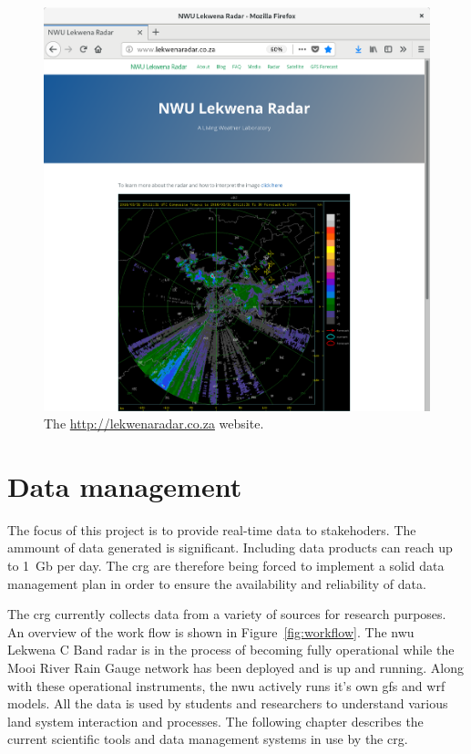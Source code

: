 \documentclass{wrcreport}
\begin{document}
\begin{figure}[!htp]
\includegraphics[width=\textwidth]{website1.png}
  \caption[The http://lekwenaradar.co.za website.]{The \url{http://lekwenaradar.co.za} website.}
 \label{fig:website}
\end{figure}

\chapter{Data management}

The focus of this project is to provide real-time data to stakehoders.
The ammount of data generated is significant. Including data products
can reach up to \SI{1}{Gb} per day. The \gls{crg} are therefore being
forced to implement a solid data management plan in order to ensure
the availability and reliability of data. 

The \gls{crg} currently collects data from a variety of sources for
research purposes. An overview of the work flow is shown in
Figure~\ref{fig:workflow}. The \gls{nwu} Lekwena C Band radar is in
the process of becoming fully operational while the Mooi River Rain
Gauge network has been deployed and is up and running. Along with
these operational instruments, the \gls{nwu} actively runs it's own
\gls{gfs} and \gls{wrf} models. All the data is used by students and
researchers to understand various land system interaction and
processes. The following chapter describes the current scientific
tools and data management systems in use by the \gls{crg}.
\end{document}
